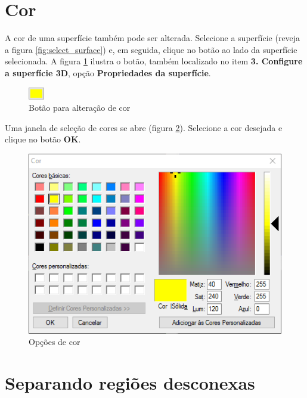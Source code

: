 \newpage

\section{Cor}

A cor de uma superfície também pode ser alterada. Selecione a superfície (reveja a figura
\ref{fig:select_surface}) e, em seguida, clique no botão ao lado da superfície selecionada. A figura
\ref{fig:change_surface_color} ilustra o botão, também localizado no item \textbf{3. Configure a
superfície 3D}, opção \textbf{Propriedades da superfície}.

\begin{figure}[!htb]
\centering
\includegraphics[scale=0.6]{../user_guide_figures/invesalius_screen/surface_button_select_color_yellow.png}
\caption{Botão para alteração de cor}
\label{fig:change_surface_color}
\end{figure}

Uma janela de seleção de cores se abre (figura \ref{fig:button_select_color}). Selecione a cor
desejada e clique no botão \textbf{OK}.

\begin{figure}[!htb]
\centering
\includegraphics[scale=0.6]{../user_guide_figures/invesalius_screen/surface_select_color_windows_so_pt.png}
\caption{Opções de cor}
\label{fig:button_select_color}
\end{figure}

\section{Separando regiões desconexas}

